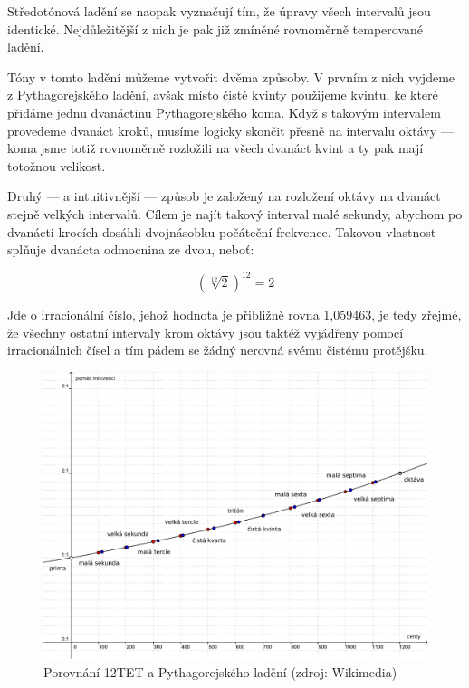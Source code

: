 \documentclass[12pt]{article}
\begin{document}
Středotónová ladění se naopak vyznačují tím, že úpravy všech intervalů jsou identické. Nejdůležitější z nich je pak již zmíněné rovnoměrně temperované ladění.

Tóny v tomto ladění můžeme vytvořit dvěma způsoby. V prvním z nich vyjdeme z Pythagorejského ladění, avšak místo čisté kvinty použijeme kvintu, ke které přidáme jednu dvanáctinu Pythagorejského koma. Když s takovým intervalem provedeme dvanáct kroků, musíme logicky skončit přesně na intervalu oktávy — koma jsme totiž rovnoměrně rozložili na všech dvanáct kvint a ty pak mají totožnou velikost.

Druhý — a intuitivnější — způsob je založený na rozložení oktávy na dvanáct stejně velkých intervalů. Cílem je najít takový interval malé sekundy, abychom po dvanácti krocích dosáhli dvojnásobku počáteční frekvence. Takovou vlastnost splňuje dvanácta odmocnina ze dvou, neboť:

\begin{equation}
(\sqrt[12]{2})^{12} = 2
\end{equation}

Jde o irracionální číslo, jehož hodnota je přibližně rovna 1,059463, je tedy zřejmé, že všechny ostatní intervaly krom oktávy jsou taktéž vyjádřeny pomocí irracionálnich čísel a tím pádem se žádný nerovná svému čistému protějšku.

\begin{figure}[p]\centering
	\includegraphics[width = \textwidth]{et_pyth_comparison.pdf}
	\caption{Porovnání 12TET a Pythagorejského ladění (zdroj: Wikimedia)}
	\label{fig:et_pyth_comparison}
\end{figure}

\pagebreak

{}

\end{document}
